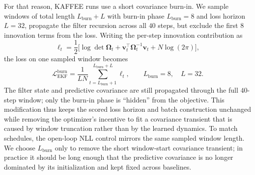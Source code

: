 \documentclass{article}
\theoremstyle{plain}
\theoremstyle{definition}
\theoremstyle{remark}
\begin{document}
For that reason, KAFFEE runs use a short covariance burn-in. We sample windows of total length $L_{\mathrm{burn}}+L$ with burn-in phase $L_{\mathrm{burn}}=8$ and loss horizon $L=32$, propagate the filter recursion across all $40$ steps, but exclude the first $8$ innovation terms from the loss. Writing the per-step innovation contribution as
\[
\ell_t = \frac12\Big[ \log\det \bm \Omega_t + \bm v_t^\top \bm \Omega_t^{-1}\bm v_t + N\log(2\pi)\Big],
\]
the loss on one sampled window becomes
\[
\mathcal L_{\mathrm{EKF}}^{\mathrm{burn}}=\frac{1}{LN}\sum_{t=L_{\mathrm{burn}}+1}^{L_{\mathrm{burn}}+L} \ell_t,
\qquad L_{\mathrm{burn}}=8,\quad L=32.
\]
The filter state and predictive covariance are still propagated through the full $40$-step window; only the burn-in phase is ``hidden'' from the objective. This modification thus keeps the scored loss horizon and batch construction unchanged while removing the optimizer's incentive to fit a covariance transient that is caused by window truncation rather than by the learned dynamics. To match schedules, the open-loop NLL control mirrors the same sampled window length. We choose $L_{\mathrm{burn}}$ only to remove the short window-start covariance transient; in practice it should be long enough that the predictive covariance is no longer dominated by its initialization and kept fixed across baselines.
\end{document}
